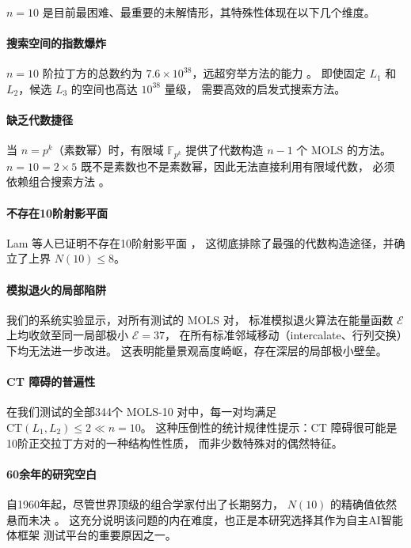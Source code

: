 \documentclass[11pt,a4paper]{ctexart}
\theoremstyle{remark}
\newcommand{\CT}{\mathrm{CT}}
\newcommand{\E}{\mathcal{E}}
\newcommand{\MOLS}{\mathrm{MOLS}}
\begin{document}
$n = 10$ 是目前最困难、最重要的未解情形，其特殊性体现在以下几个维度。

\paragraph{搜索空间的指数爆炸}
$n = 10$ 阶拉丁方的总数约为 $7.6 \times 10^{38}$，远超穷举方法的能力 \cite{knuth2000}。
即使固定 $L_1$ 和 $L_2$，候选 $L_3$ 的空间也高达 $10^{38}$ 量级，
需要高效的启发式搜索方法。

\paragraph{缺乏代数捷径}
当 $n = p^k$（素数幂）时，有限域 $\mathbb{F}_{p^k}$ 提供了代数构造 $n-1$ 个 $\MOLS$ 的方法。
$n = 10 = 2 \times 5$ 既不是素数也不是素数幂，因此无法直接利用有限域代数，
必须依赖组合搜索方法 \cite{denes1991}。

\paragraph{不存在10阶射影平面}
Lam 等人已证明不存在10阶射影平面 \cite{lam1989}，
这彻底排除了最强的代数构造途径，并确立了上界 $N(10) \le 8$。

\paragraph{模拟退火的局部陷阱}
我们的系统实验显示，对所有测试的 $\MOLS$ 对，
标准模拟退火算法在能量函数 $\E$ 上均收敛至同一局部极小 $\E = 37$，
在所有标准邻域移动（intercalate、行列交换）下均无法进一步改进。
这表明能量景观高度崎岖，存在深层的局部极小壁垒。

\paragraph{CT 障碍的普遍性}
在我们测试的全部344个 $\MOLS$-10 对中，每一对均满足 $\CT(L_1, L_2) \le 2 \ll n = 10$。
这种压倒性的统计规律性提示：CT 障碍很可能是10阶正交拉丁方对的一种结构性性质，
而非少数特殊对的偶然特征。

\paragraph{60余年的研究空白}
自1960年起，尽管世界顶级的组合学家付出了长期努力，
$N(10)$ 的精确值依然悬而未决 \cite{colbourn2006,wanless2011}。
这充分说明该问题的内在难度，也正是本研究选择其作为自主AI智能体框架
测试平台的重要原因之一。
\end{document}
